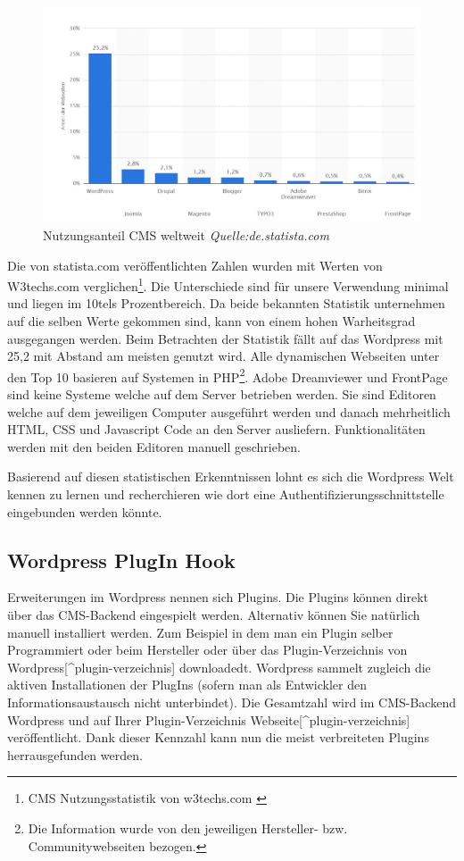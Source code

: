 \begin{figure}[htbp]
\centering
\includegraphics{images/cms_statistik_november2015.JPG}
\caption{Nutzungsanteil CMS weltweit \emph{Quelle:de.statista.com}}
\end{figure}

Die von statista.com veröffentlichten Zahlen wurden mit Werten von
W3techs.com verglichen\footnote{CMS Nutzungsstatistik von w3techs.com
  \autocite{statisticinfow3techs}}. Die Unterschiede sind für unsere
Verwendung minimal und liegen im 10tels Prozentbereich. Da beide
bekannten Statistik unternehmen auf die selben Werte gekommen sind, kann
von einem hohen Warheitsgrad ausgegangen werden. Beim Betrachten der
Statistik fällt auf das Wordpress mit 25,2 mit Abstand am meisten
genutzt wird. Alle dynamischen Webseiten unter den Top 10 basieren auf
Systemen in PHP\footnote{Die Information wurde von den jeweiligen
  Hersteller- bzw. Communitywebseiten bezogen.}. Adobe Dreamviewer und
FrontPage sind keine Systeme welche auf dem Server betrieben werden. Sie
sind Editoren welche auf dem jeweiligen Computer ausgeführt werden und
danach mehrheitlich HTML, CSS und Javascript Code an den Server
ausliefern. Funktionalitäten werden mit den beiden Editoren manuell
geschrieben.

Basierend auf diesen statistischen Erkenntnissen lohnt es sich die
Wordpress Welt kennen zu lernen und recherchieren wie dort eine
Authentifizierungsschnittstelle eingebunden werden könnte.

\subsection{Wordpress PlugIn Hook}\label{wordpress-plugin-hook}

Erweiterungen im Wordpress nennen sich Plugins. Die Plugins können
direkt über das CMS-Backend eingespielt werden. Alternativ können Sie
natürlich manuell installiert werden. Zum Beispiel in dem man ein Plugin
selber Programmiert oder beim Hersteller oder über das
Plugin-Verzeichnis von Wordpress{[}\^{}plugin-verzeichnis{]}
downloadedt. Wordpress sammelt zugleich die aktiven Installationen der
PlugIns (sofern man als Entwickler den Informationsaustausch nicht
unterbindet). Die Gesamtzahl wird im CMS-Backend Wordpress und auf Ihrer
Plugin-Verzeichnis Webseite{[}\^{}plugin-verzeichnis{]} veröffentlicht.
Dank dieser Kennzahl kann nun die meist verbreiteten Plugins
herrausgefunden werden.

